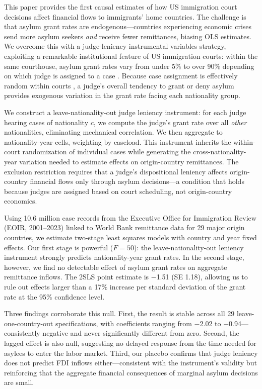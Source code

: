 \documentclass[12pt]{article}
\begin{document}
This paper provides the first causal estimates of how US immigration court decisions affect financial flows to immigrants' home countries. The challenge is that asylum grant rates are endogenous---countries experiencing economic crises send more asylum seekers \emph{and} receive fewer remittances, biasing OLS estimates. We overcome this with a judge-leniency instrumental variables strategy, exploiting a remarkable institutional feature of US immigration courts: within the same courthouse, asylum grant rates vary from under 5\% to over 90\% depending on which judge is assigned to a case \citep{Ramji-Nogales2007, Miller2015}. Because case assignment is effectively random within courts \citep{GAO2008, GAO2017}, a judge's overall tendency to grant or deny asylum provides exogenous variation in the grant rate facing each nationality group.

We construct a leave-nationality-out judge leniency instrument: for each judge hearing cases of nationality $c$, we compute the judge's grant rate over all \emph{other} nationalities, eliminating mechanical correlation. We then aggregate to nationality-year cells, weighting by caseload. This instrument inherits the within-court randomization of individual cases while generating the cross-nationality-year variation needed to estimate effects on origin-country remittances. The exclusion restriction requires that a judge's dispositional leniency affects origin-country financial flows only through asylum decisions---a condition that holds because judges are assigned based on court scheduling, not origin-country economics.

Using 10.6 million case records from the Executive Office for Immigration Review (EOIR, 2001--2023) linked to World Bank remittance data for 29 major origin countries, we estimate two-stage least squares models with country and year fixed effects. Our first stage is powerful ($F=50$): the leave-nationality-out leniency instrument strongly predicts nationality-year grant rates. In the second stage, however, we find no detectable effect of asylum grant rates on aggregate remittance inflows. The 2SLS point estimate is $-$1.51 (SE 1.18), allowing us to rule out effects larger than a 17\% increase per standard deviation of the grant rate at the 95\% confidence level.

Three findings corroborate this null. First, the result is stable across all 29 leave-one-country-out specifications, with coefficients ranging from $-$2.02 to $-$0.94---consistently negative and never significantly different from zero. Second, the lagged effect is also null, suggesting no delayed response from the time needed for asylees to enter the labor market. Third, our placebo confirms that judge leniency does not predict FDI inflows either---consistent with the instrument's validity but reinforcing that the aggregate financial consequences of marginal asylum decisions are small.
\end{document}
